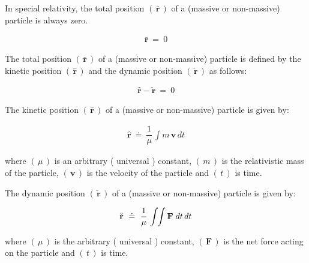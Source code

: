 \documentclass[10pt,fleqn]{article}
\begin{document}
\noindent In special relativity, the total position $( \, \bar{\mathbf{r}} \, )$ of a (massive or non-massive) particle is always zero.
\par \vspace{-0.60em}
\begin{eqnarray*}
\bar{\mathbf{r}} ~=~ 0
\end{eqnarray*}
\par \vspace{+0.60em}
\noindent The total position $( \, \bar{\mathbf{r}} \, )$ of a (massive or non-massive) particle is defined by the kinetic position $( \, \hat{\mathbf{r}} \, )$ and the dynamic position $( \, \check{\mathbf{r}} \, )$ as follows:
\par \vspace{-0.60em}
\begin{eqnarray*}
\hat{\mathbf{r}} - \check{\mathbf{r}} ~=~ 0
\end{eqnarray*}
\par \vspace{+0.60em}
\noindent The kinetic position $( \, \hat{\mathbf{r}} \, )$ of a (massive or non-massive) particle is given by:
\par \vspace{-0.60em}
\begin{eqnarray*}
\hat{\mathbf{r}} ~\doteq~ \dfrac{1}{\mu} \, \int m \, \mathbf{v} \, dt
\end{eqnarray*}
\par \vspace{+0.45em}
\noindent where $( \, \mu \, )$ is an arbitrary ( universal ) constant, $( \, m \, )$ is the relativistic mass of the particle, $( \, \mathbf{v} \, )$ is the velocity of the particle and $( \, t \, )$ is time.
\par \vspace{+0.60em}
\noindent The dynamic position $( \, \check{\mathbf{r}} \, )$ of a (massive or non-massive) particle is given by:
\par \vspace{-0.60em}
\begin{eqnarray*}
\check{\mathbf{r}} ~\doteq~ \dfrac{1}{\mu} \, \int \hspace{-0.30em} \int \mathbf{F} \; dt \, dt
\end{eqnarray*}
\par \vspace{+0.45em}
\noindent where $( \, \mu \, )$ is the arbitrary ( universal ) constant, $( \, \mathbf{F} \, )$ is the net force acting on the particle and $( \, t \, )$ is time.
\end{document}
